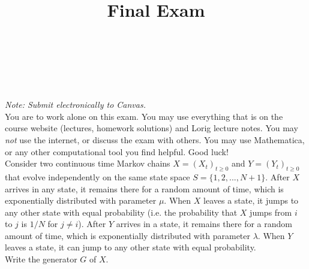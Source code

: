 \documentclass[10pt]{amsart}
\begin{document}
\noindent
{} \\
 \\
 \\
\title{Final Exam}
\maketitle

{\it Note: Submit electronically to Canvas.}
\\

 You are to work alone on this exam. You may use everything that is on the course website (lectures, homework solutions) and Lorig lecture notes. You may {\it not} use the internet, or discuss the exam with others. You may use Mathematica, or any other computational tool you find helpful. Good luck! 
\\

 Consider two continuous time Markov chains $X=(X_t)_{t\geq0}$ and $Y=(Y_t)_{t\geq0}$ that evolve independently on the same state space $S=\{1,2,...,N+1\}$. After $X$ arrives in any state, it remains there for a random amount of time, which is exponentially distributed with parameter $\mu$. When $X$ leaves a state, it jumps to any other state with equal probability (i.e. the probability that $X$ jumps from $i$ to $j$ is $1/N$ for $j \neq i$). After $Y$ arrives in a state, it remains there for a random amount of time, which is exponentially distributed with parameter $\lambda$. When $Y$ leaves a state, it can jump to any other state with equal probability. 
\\

 Write the generator $G$ of $X$. \\
\end{document}
